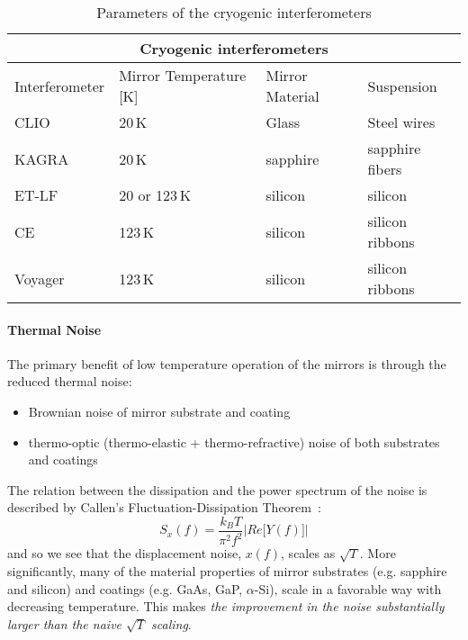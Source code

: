 \begin{table}[h]
\centering
\begin{tabular}{ |l||l|l|l|  }
 \hline
 \multicolumn{4}{|c|}{Cryogenic interferometers} \\
 \hline
 Interferometer & Mirror Temperature [K] & Mirror Material & Suspension \\
 \hline
 CLIO           &   20\,K           & Glass     &  Steel wires \\
 KAGRA          &   20\,K           & sapphire  &  sapphire fibers  \\
 ET-LF             &   20 or 123\,K    & silicon   &  silicon  \\
 CE             &   123\,K          & silicon   &  silicon ribbons \\
 Voyager        &   123\,K          & silicon   &  silicon ribbons \\

 \hline
\end{tabular}
\caption[Cryo IFOs]{Parameters of the cryogenic interferometers}
\label{}
\end{table}

\begin{tcolorbox}[standard jigsaw,colframe=ocre,colback=blanchedalmond!10!white,opacityback=0.6,coltext=black]
\paragraph{Thermal Noise}
The primary benefit of low temperature operation of the mirrors is through the reduced thermal noise:
\begin{itemize}
\item Brownian noise of mirror substrate and coating
\item thermo-optic (thermo-elastic + thermo-refractive) noise of both substrates and coatings
\end{itemize}
The relation between the dissipation and the power spectrum of the noise is described by Callen's Fluctuation-Dissipation Theorem~\cite{CaWe1951, Kubo:FDT, Callen:1959}:
\begin{equation}
S_x(f) = \frac{k_B T}{\pi^2 f^2} \left| Re \big[ Y(f) \big]\right|
\label{eq:FDT}
\end{equation}
and so we see that the displacement noise, $x(f)$, scales as $\sqrt{T}$. More significantly, many of the material properties of mirror substrates (e.g. sapphire and silicon) and coatings (e.g. GaAs, GaP, $\alpha$-Si), scale in a favorable way with decreasing temperature. This makes \emph{the improvement in the noise substantially larger than the naive $\sqrt{T}$ scaling}.
\end{tcolorbox}

